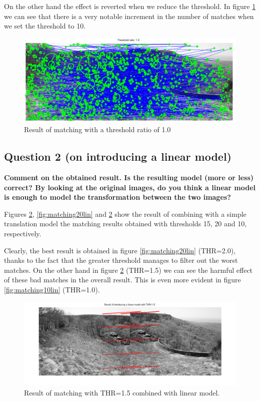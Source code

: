 On the other hand the effect is reverted when we reduce the threshold. In figure
\ref{fig:matching10thres} we can see that there is a very notable increment in
the number of matches when we set the threshold to 10.

\begin{figure}[htb]
	\centering
		\includegraphics[width=\textwidth]{./img/ex1/matching_10_thres.png}
	\caption{Result of matching with a threshold ratio of 1.0}
	\label{fig:matching10thres}
\end{figure}

\subsection{Question 2 (on introducing a linear model)}

{\bfseries Comment on the obtained result. Is the resulting model (more
or less) correct? By looking at the original images, do you think a linear model
is enough to model the transformation between the two images?\\[.5cm]}

Figures \ref{fig:matching15lin}, \ref{fig:matching20lin} and \ref{fig:matching15lin}
show the result of combining with a simple translation model the matching results
obtained with thresholds 15, 20 and 10, respectively.

Clearly, the best result is obtained in figure \ref{fig:matching20lin} (THR=2.0),
thanks to the fact that the greater threshold manages to filter out the worst matches.
On the other hand in figure \ref{fig:matching15lin} (THR=1.5) we can see the harmful
effect of these bad matches in the overall result.
This is even more evident in figure \ref{fig:matching10lin} (THR=1.0).

\begin{figure}[htb]
	\centering
		\includegraphics[width=\textwidth]{./img/ex1/matching_linear_model_15.png}
	\caption{Result of matching with THR=1.5 combined with linear model.}
	\label{fig:matching15lin}
\end{figure}

